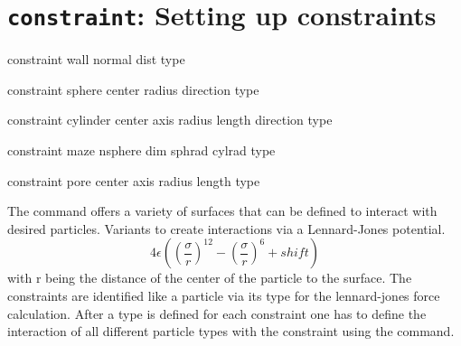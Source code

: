 \section{\texttt{constraint}: Setting up constraints}\label{sec:constraint}

\begin{essyntax}
  constraint wall normal    
  dist  type 
  
  constraint sphere center    
  radius  direction  type  
  
  constraint cylinder center    
  axis    
  radius  length  
  direction  
  type  
  
  constraint maze nsphere  
  dim  sphrad  cylrad 
  type 
  
  constraint pore center    
  axis    
  radius  length  
  type  
  
  
  

  \begin{features}
  \end{features}
\end{essyntax}

The  command offers a variety of surfaces that can be
defined to interact with desired particles. Variants  to 
create interactions via a
Lennard-Jones potential. \[4 \epsilon \left(\left(\frac{\sigma}{r}\right)^{12} -
  \left(\frac{\sigma}{r}\right)^6 + shift\right)\] with r being the
distance of the center of the particle to the surface. The constraints are identified like a particle via its
type for the lennard-jones force calculation. 
After a type is defined for each constraint one has
to define
the interaction of all different particle types with the constraint using
the  command.

